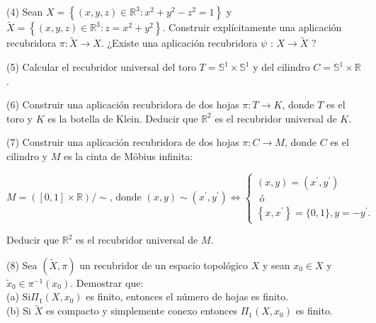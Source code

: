 \documentclass[
  a4paper,
  spanish,
  12pt,
]{scrartcl}
\begin{document}
\begin{ejer}
(4) Sean $X=\left\{(x, y, z) \in \mathbb{R}^{3}: x^{2}+y^{2}-z^{2}=1\right\}$ y $\widetilde{X}=\left\{(x, y, z) \in \mathbb{R}^{3}: z=x^{2}+y^{2}\right\}$. Construir explícitamente una aplicación recubridora $\pi: \widetilde{X} \rightarrow X$. ¿Existe una aplicación recubridora $\psi$ : $X \rightarrow \widetilde{X}$ ?\\
\end{ejer}

\begin{ejer}
(5) Calcular el recubridor universal del toro $T=\mathbb{S}^{1} \times \mathbb{S}^{1}$ y del cilindro $C=\mathbb{S}^{1} \times \mathbb{R}$.\\
\end{ejer}

\begin{ejer}
(6) Construir una aplicación recubridora de dos hojas $\pi: T \rightarrow K$, donde $T$ es el toro y $K$ es la botella de Klein. Deducir que $\mathbb{R}^{2}$ es el recubridor universal de $K$.\\
\end{ejer}

\begin{ejer}
(7) Construir una aplicación recubridora de dos hojas $\pi: C \rightarrow M$, donde $C$ es el cilindro y $M$ es la cinta de Möbius infinita:

$$
M=([0,1] \times \mathbb{R}) / \sim \text {, donde }(x, y) \sim\left(x^{\prime}, y^{\prime}\right) \Leftrightarrow\left\{\begin{array}{l}
(x, y)=\left(x^{\prime}, y^{\prime}\right) \\
\text { ó } \\
\left\{x, x^{\prime}\right\}=\{0,1\}, y=-y^{\prime} .
\end{array}\right.
$$


Deducir que $\mathbb{R}^{2}$ es el recubridor universal de $M$.\\
\end{ejer}

\begin{ejer}
(8) Sea $(\widetilde{X}, \pi)$ un recubridor de un espacio topológico $X$ y sean $x_{0} \in X$ y $\widetilde{x}_{0} \in \pi^{-1}\left(x_{0}\right)$. Demostrar que:\\
(a) $\mathrm{Si} \Pi_{1}\left(X, x_{0}\right)$ es finito, entonces el número de hojas es finito.\\
(b) Si $\widetilde{X}$ es compacto y simplemente conexo entonces $\Pi_{1}\left(X, x_{0}\right)$ es finito.\\
\end{ejer}
\end{document}
